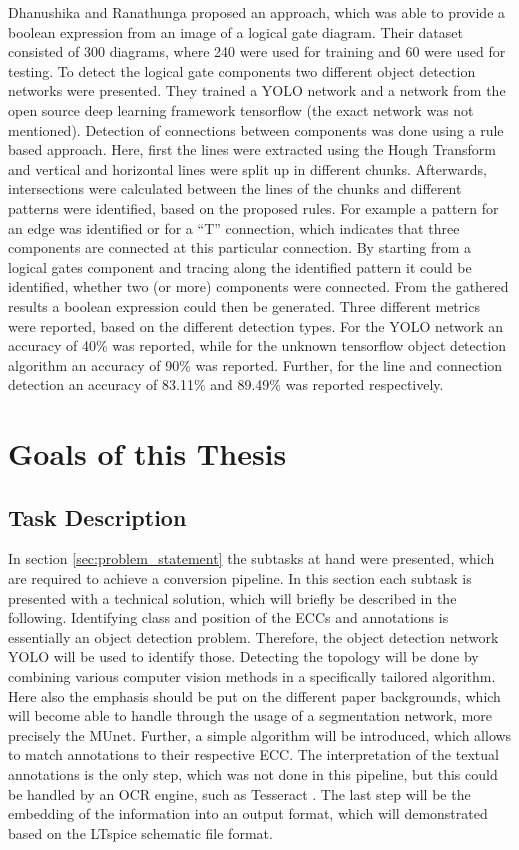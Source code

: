 Dhanushika and Ranathunga \cite{ecd_yolobool} proposed an approach, which was able to provide a boolean expression from an image of a logical gate diagram.
Their dataset consisted of 300 diagrams, where 240 were used for training and 60 were used for testing.
To detect the logical gate components two different object detection networks were presented.
They trained a \ac{YOLO} network and a network from the open source deep learning framework tensorflow (the exact network was not mentioned).
Detection of connections between components was done using a rule based approach.
Here, first the lines were extracted using the Hough Transform and vertical and horizontal lines were split up in different chunks.
Afterwards, intersections were calculated between the lines of the chunks and different patterns were identified, based on the proposed rules.
For example a pattern for an edge was identified or for a ``T'' connection, which indicates that three components are connected at this particular connection.
By starting from a logical gates component and tracing along the identified pattern it could be identified, whether two (or more) components were connected.
From the gathered results a boolean expression could then be generated.
Three different metrics were reported, based on the different detection types.
For the \ac{YOLO} network an accuracy of 40\%  was reported, while for the unknown tensorflow object detection algorithm an accuracy of 90\% was reported.
Further, for the line and connection detection an accuracy of 83.11\% and 89.49\% was reported respectively.

\section{Goals of this Thesis}

\subsection{Task Description}

In section \ref{sec:problem_statement} the subtasks at hand were presented, which are required to achieve a conversion pipeline.
In this section each subtask is presented with a technical solution, which will briefly be described in the following.
Identifying class and position of the \acp{ECC} and annotations is essentially an object detection problem.
Therefore, the object detection network \ac{YOLO} will be used to identify those.
Detecting the topology will be done by combining various computer vision methods in a specifically tailored algorithm.
Here also the emphasis should be put on the different paper backgrounds, which will become able to handle through the usage of a segmentation network, more precisely the \ac{MUnet}.
Further, a simple algorithm will be introduced, which allows to match annotations to their respective \ac{ECC}.
The interpretation of the textual annotations is the only step, which was not done in this pipeline, but this could be handled by an \ac{OCR} engine, such as Tesseract \cite{tesseract}.
The last step will be the embedding of the information into an output format, which will demonstrated based on the LTspice schematic file format.

